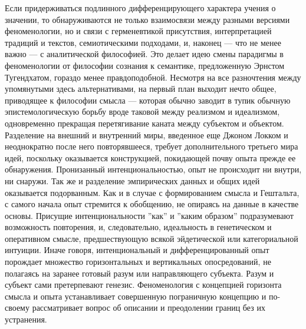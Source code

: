 \documentclass[12pt]{book}
\begin{document}
Если придерживаться подлинного дифференцирующего характера учения о значении, то обнаруживаются не только взаимосвязи между разными версиями феноменологии, но и связи с герменевтикой присутствия, интерпретацией традиций и текстов, семиотическими подходами, и, наконец --- что не менее важно --- с аналитической философией. Это делает идею смены парадигмы в феноменологии от философии сознания к семантике, предложенную Эрнстом Тугендхатом, гораздо менее правдоподобной. Несмотря на все разночтения между упомянутыми здесь альтернативами, на первый план выходит нечто общее, приводящее к философии смысла --- которая обычно заводит в тупик обычную эпистемологическую борьбу вроде таковой между реализмом и идеализмом, одновременно прекращая перетягивание каната между субъектом и объектом. Разделение на внешний и внутренний миры, введенное еще Джоном Локком и неоднократно после него повторявшееся, требует дополнительного третьего мира идей, поскольку оказывается конструкцией, покидающей почву опыта прежде ее обнаружения. Пронизанный интенциональностью, опыт не происходит ни внутри, ни снаружи. Так же и разделение эмпирических данных и общих идей оказывается подорванным. Как и в случае с формированием смысла и Гештальта, с самого начала опыт стремится к обобщению, не опираясь на данные в качестве основы. Присущие интенциональности ''как'' и ''каким образом'' подразумевают возможность повторения, и, следовательно, идеальность в генетическом и оперативном смысле, предшествующую всякой эйдетической или категориальной интуиции. Иначе говоря, интенциональный и дифференцированный опыт порождает множество горизонтальных и вертикальных опосредований, не полагаясь на заранее готовый разум или направляющего субъекта. Разум и субъект сами претерпевают генезис. Феноменология с концепцией горизонта смысла и опыта устанавливает совершенную пограничную концепцию и по-своему рассматривает вопрос об описании и преодолении границ без их устранения.
\end{document}
